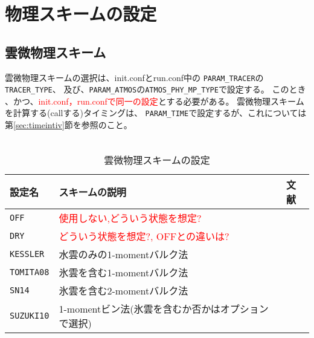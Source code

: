 \section{物理スキームの設定} \label{sec:basic_physics}

\subsection{雲微物理スキーム} \label{sec:basic_microphys}
雲微物理スキームの選択は、init.confとrun.conf中の
\verb|PARAM_TRACER|の\verb|TRACER_TYPE|、
及び、\verb|PARAM_ATMOS|の\verb|ATMOS_PHY_MP_TYPE|で設定する。
このとき{\color{red}{\verb|TRACER_TYPE|と\verb|ATMOS_PHY_MP_TYPE|は同じものを設定し}}
、かつ、\textcolor{red}{init.conf，run.confで同一の設定}とする必要がある。
雲微物理スキームを計算する(callする)タイミングは、
\verb|PARAM_TIME|で設定するが、これについては
第\ref{sec:timeintiv}節を参照のこと。\\



\\

\begin{table}[h]
\begin{center}
  \caption{雲微物理スキームの設定}
  \label{tab:nml_atm_mp}
  \begin{tabularx}{150mm}{lXX} \hline
    \rowcolor[gray]{0.9}  設定名 & スキームの説明 & 文献\\ \hline
     \verb|OFF|      & \textcolor{red}{使用しない,どういう状態を想定?} &  \\
     \verb|DRY|      & \textcolor{red}{どういう状態を想定?, OFFとの違いは?} &  \\
     \verb|KESSLER|  & 水雲のみの1-momentバルク法 & \citet{kessler_1969} \\
     \verb|TOMITA08| & 氷雲を含む1-momentバルク法 & \citet{tomita_2008} \\
     \verb|SN14|     & 氷雲を含む2-momentバルク法 & \citet{sn_2014} \\
     \verb|SUZUKI10| & 1-momentビン法(氷雲を含むか否かはオプションで選択) & \citet{suzuki_etal_2010} \\
    \hline
  \end{tabularx}
\end{center}
\end{table}

